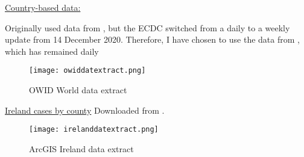 \underline{Country-based data:}

Originally used data from \cite{ecdcdata},  but the ECDC switched from a daily to a weekly update from 14 December 2020. Therefore, I have chosen to use the data from  \cite{countrydata}, which has remained daily

\begin{figure}[!htb]
  \texttt{[image: owiddatextract.png]} \label{fig:owiddatextract}
\endminipage
\caption{OWID World data extract}
\end{figure}

\underline{Ireland cases by county}
Downloaded from \cite{irelanddata}.

\begin{figure}[!htb]
  \texttt{[image: irelanddatextract.png]} \label{fig:irelanddatextract}
\endminipage
\caption{ArcGIS Ireland data extract}
\end{figure}